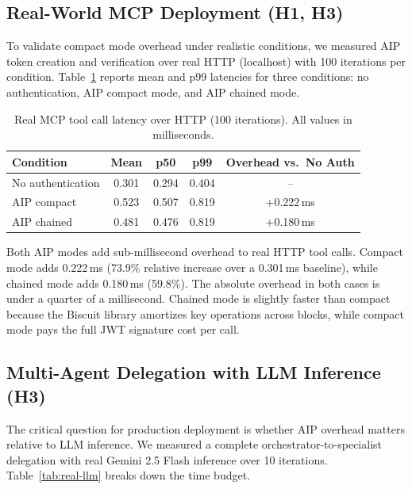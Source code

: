 \documentclass[11pt,a4paper]{article}
\newcommand{\aip}{\textsc{AIP}}
\begin{document}
\subsection{Real-World MCP Deployment (H1, H3)}
\label{sec:real-mcp}

To validate compact mode overhead under realistic conditions, we measured \aip{} token creation and verification over real HTTP (localhost) with 100 iterations per condition. Table~\ref{tab:real-mcp} reports mean and p99 latencies for three conditions: no authentication, \aip{} compact mode, and \aip{} chained mode.

\begin{table}[t]
\centering
\caption{Real MCP tool call latency over HTTP (100 iterations). All values in milliseconds.}
\label{tab:real-mcp}
\footnotesize
\begin{tabular}{@{}lcccc@{}}
\toprule
\textbf{Condition} & \textbf{Mean} & \textbf{p50} & \textbf{p99} & \textbf{Overhead vs.\ No Auth} \\
\midrule
No authentication  & 0.301 & 0.294 & 0.404 & -- \\
AIP compact        & 0.523 & 0.507 & 0.819 & +0.222\,ms \\
AIP chained        & 0.481 & 0.476 & 0.819 & +0.180\,ms \\
\bottomrule
\end{tabular}
\end{table}

Both \aip{} modes add sub-millisecond overhead to real HTTP tool calls. Compact mode adds 0.222\,ms (73.9\% relative increase over a 0.301\,ms baseline), while chained mode adds 0.180\,ms (59.8\%). The absolute overhead in both cases is under a quarter of a millisecond. Chained mode is slightly faster than compact because the Biscuit library amortizes key operations across blocks, while compact mode pays the full JWT signature cost per call.

\subsection{Multi-Agent Delegation with LLM Inference (H3)}
\label{sec:real-llm}

The critical question for production deployment is whether \aip{} overhead matters relative to LLM inference. We measured a complete orchestrator-to-specialist delegation with real Gemini 2.5 Flash inference over 10 iterations. Table~\ref{tab:real-llm} breaks down the time budget.
\end{document}
